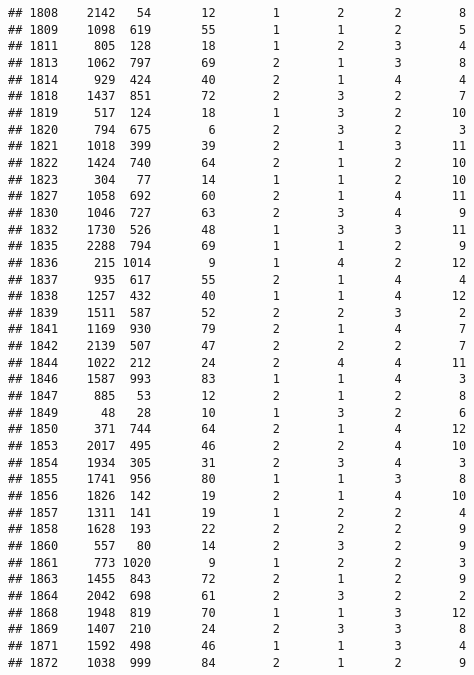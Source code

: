 \documentclass[]{article}
\begin{document}
\begin{verbatim}
## 1808    2142   54       12        1        2       2        8
## 1809    1098  619       55        1        1       2        5
## 1811     805  128       18        1        2       3        4
## 1813    1062  797       69        2        1       3        8
## 1814     929  424       40        2        1       4        4
## 1818    1437  851       72        2        3       2        7
## 1819     517  124       18        1        3       2       10
## 1820     794  675        6        2        3       2        3
## 1821    1018  399       39        2        1       3       11
## 1822    1424  740       64        2        1       2       10
## 1823     304   77       14        1        1       2       10
## 1827    1058  692       60        2        1       4       11
## 1830    1046  727       63        2        3       4        9
## 1832    1730  526       48        1        3       3       11
## 1835    2288  794       69        1        1       2        9
## 1836     215 1014        9        1        4       2       12
## 1837     935  617       55        2        1       4        4
## 1838    1257  432       40        1        1       4       12
## 1839    1511  587       52        2        2       3        2
## 1841    1169  930       79        2        1       4        7
## 1842    2139  507       47        2        2       2        7
## 1844    1022  212       24        2        4       4       11
## 1846    1587  993       83        1        1       4        3
## 1847     885   53       12        2        1       2        8
## 1849      48   28       10        1        3       2        6
## 1850     371  744       64        2        1       4       12
## 1853    2017  495       46        2        2       4       10
## 1854    1934  305       31        2        3       4        3
## 1855    1741  956       80        1        1       3        8
## 1856    1826  142       19        2        1       4       10
## 1857    1311  141       19        1        2       2        4
## 1858    1628  193       22        2        2       2        9
## 1860     557   80       14        2        3       2        9
## 1861     773 1020        9        1        2       2        3
## 1863    1455  843       72        2        1       2        9
## 1864    2042  698       61        2        3       2        2
## 1868    1948  819       70        1        1       3       12
## 1869    1407  210       24        2        3       3        8
## 1871    1592  498       46        1        1       3        4
## 1872    1038  999       84        2        1       2        9

\end{verbatim}
\end{document}
